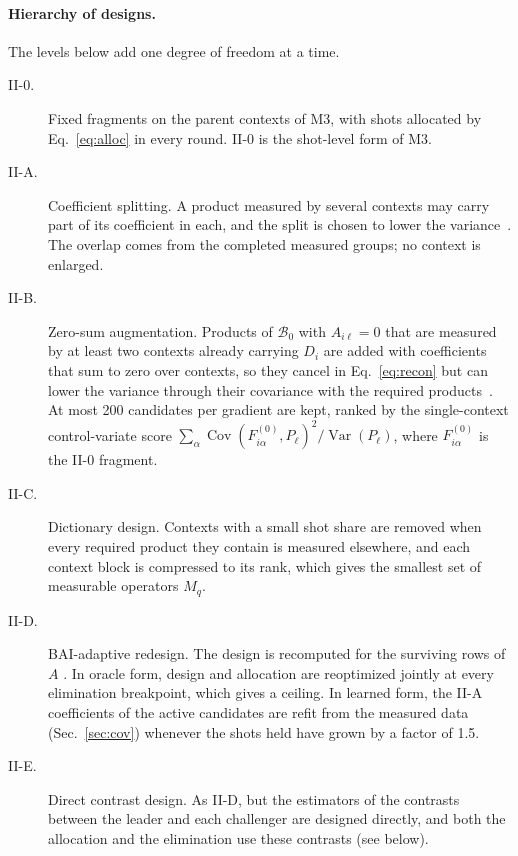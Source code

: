 \documentclass[aps,pra,reprint,superscriptaddress,nofootinbib]{revtex4-2}
\begin{document}
\paragraph{Hierarchy of designs.} The levels below add one degree of freedom at a time.
\begin{description}
\item[II-0.] Fixed fragments on the parent contexts of M3, with shots allocated by Eq.~\eqref{eq:alloc} in every round. II-0 is the shot-level form of M3.
\item[II-A.] Coefficient splitting. A product measured by several contexts may carry part of its coefficient in each, and the split is chosen to lower the variance~\cite{yen2023}. The overlap comes from the completed measured groups; no context is enlarged.
\item[II-B.] Zero-sum augmentation. Products of $\mathcal B_0$ with $A_{i\ell}=0$ that are measured by at least two contexts already carrying $D_i$ are added with coefficients that sum to zero over contexts, so they cancel in Eq.~\eqref{eq:recon} but can lower the variance through their covariance with the required products~\cite{choi2022}. At most 200 candidates per gradient are kept, ranked by the single-context control-variate score $\sum_\alpha\operatorname{Cov}(F^{(0)}_{i\alpha},P_\ell)^2/\operatorname{Var}(P_\ell)$, where $F^{(0)}_{i\alpha}$ is the II-0 fragment.
\item[II-C.] Dictionary design. Contexts with a small shot share are removed when every required product they contain is measured elsewhere, and each context block is compressed to its rank, which gives the smallest set of measurable operators $M_q$. 
\item[II-D.] BAI-adaptive redesign. The design is recomputed for the surviving rows of $A$ . In oracle form, design and allocation are reoptimized jointly at every elimination breakpoint, which gives a ceiling. In learned form, the II-A coefficients of the active candidates are refit from the measured data (Sec.~\ref{sec:cov}) whenever the shots held have grown by a factor of 1.5.
\item[II-E.] Direct contrast design. As II-D, but the estimators of the contrasts between the leader and each challenger are designed directly, and both the allocation and the elimination use these contrasts (see below).
\end{description}
\end{document}
